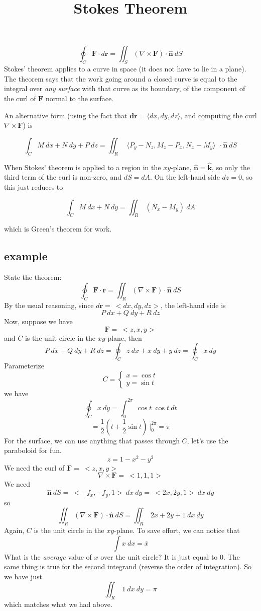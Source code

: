 \documentclass[11pt, oneside]{article}
\title{Stokes Theorem}
\date{}
\begin{document}
\maketitle
\Large

\[ \oint_C \mathbf{F} \cdot d \mathbf{r} = \iint_S ( \nabla \times \mathbf{F}) \cdot \hat{\mathbf{n}} \ dS \]
Stokes' theorem applies to a curve in space (it does not have to lie in a plane).  The theorem says that the work going around a closed curve is equal to the integral over \emph{any surface} with that curve as its boundary, of the component of the curl of $\mathbf{F}$ normal to the surface. 

An alternative form (using the fact that $\mathbf{dr} = \langle dx,dy,dz \rangle$, and computing the curl $\nabla \times \mathbf{F}$) is

\[ \int_C M \ dx + N \ dy + P \ dz = \iint_R   \ \ \langle P_y-N_z,M_z-P_x,N_x-M_y \rangle \  \  \cdot  \hat{\mathbf{n}} \ dS \]

When Stokes' theorem is applied to a region in the $xy$-plane, $\hat{\mathbf{n}} = \hat{\mathbf{k}}$, so only the third term of the curl is non-zero, and $dS = dA$.  On the left-hand side $dz=0$, so this just reduces to

\[  \int_C M \ dx + N \ dy  = \iint_R \ (N_x-M_y) \ dA \]

which is Green's theorem for work.

\subsection*{example}

State the theorem:
\[ \oint_C \mathbf{F} \cdot \mathbf{r} = \iint_R (\nabla \times \mathbf{F}) \cdot \hat{\mathbf{n}} \ dS \]
By the usual reasoning, since $d\mathbf{r} = \ <dx,dy,dz>$, the left-hand side is
\[ P \ dx + Q \ dy + R \ dz \]
Now, suppose we have 
\[ \mathbf{F} = \ <z,x,y> \]
and $C$ is the unit circle in the $xy$-plane,
then 
\[ P \ dx + Q \ dy + R \ dz = \oint_C  z \ dx + x \ dy + y \ dz =   \oint_C x \ dy \]
Parameterize
\[ C =
\left\{
	\begin{array}{l}
		x  = \cos t  \\
		y  = \sin t
	\end{array}
\right.
\]
we have
\[ \oint_C x \ dy = \int_0^{2\pi} \ \cos t \ \cos t \ dt \]
\[ = \frac{1}{2}(t + \frac{1}{2} \sin t) \ \bigg |_0^{2\pi} = \pi \]
For the surface, we can use anything that passes through $C$, let's use the paraboloid for fun.
\[ z = 1 - x^2 - y^2 \]
We need the curl of $\mathbf{F} = \ <z,x,y> $
\[ \nabla \times \mathbf{F} = \ < 1,1,1> \]
We need
\[ \hat{\mathbf{n}} \ dS = \ <-f_x,-f_y,1> \ dx \ dy =  \ <2x,2y,1> \ dx \ dy \]
so
\[ \iint_R (\nabla \times \mathbf{F}) \cdot \hat{\mathbf{n}} \ dS =  \iint_R \ 2x + 2y + 1 \ dx \ dy \]
Again, $C$ is the unit circle in the $xy$-plane.  To save effort, we can notice that 
\[ \int x \ dx = \overline{x} \]
What is the \emph{average} value of $x$ over the unit circle?  It is just equal to $0$.  The same thing is true for the second integrand (reverse the order of integration).  So we have just
\[ \iint_R \  1 \ dx \ dy = \pi \]
which matches what we had above.
\end{document}
